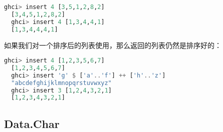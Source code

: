 \documentclass[./main.tex]{subfiles}
\begin{document}
\begin{lstlisting}[language=Haskell]
  ghci> insert 4 [3,5,1,2,8,2]
  [3,4,5,1,2,8,2]
  ghci> insert 4 [1,3,4,4,1]
  [1,3,4,4,4,1]
\end{lstlisting}

如果我们对一个排序后的列表使用，那么返回的列表仍然是排序好的：

\begin{lstlisting}[language=Haskell]
  ghci> insert 4 [1,2,3,5,6,7]
  [1,2,3,4,5,6,7]
  ghci> insert 'g' $ ['a'..'f'] ++ ['h'..'z']
  "abcdefghijklmnopqrstuvwxyz"
  ghci> insert 3 [1,2,4,3,2,1]
  [1,2,3,4,3,2,1]
\end{lstlisting}













\subsection*{Data.Char}

\end{document}
